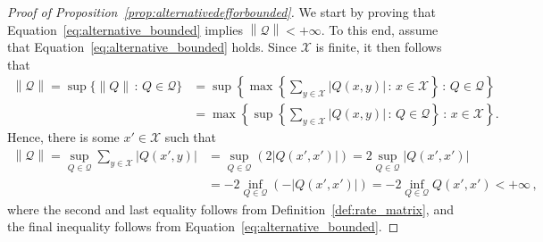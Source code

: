 \documentclass[10pt,a4paper]{paper}
\theoremstyle{definition}
\newcommand{\states}{\mathcal{X}}
\newcommand{\rateset}{\mathcal{Q}}
\newcommand{\norm}[1]{\left\lVert #1 \right\rVert}
\newcommand{\abs}[1]{\left\vert #1 \right\vert}
\newcommand{\coloneqq}{:\!=}
\begin{document}
\begin{proof}[Proof of Proposition~\ref{prop:alternativedefforbounded}]
We start by proving that Equation~\eqref{eq:alternative_bounded} implies $\norm{\rateset}<+\infty$. %
 To this end, assume that Equation~\eqref{eq:alternative_bounded} holds. Since $\states$ is finite, it then follows that
\begin{align*}
\norm{\rateset} = \sup\{\norm{Q}\,:\,Q\in\rateset\}
 &= \sup\left\{\max\left\{\sum_{y\in\states}\abs{Q(x,y)}\,:\,x\in\states\right\}\,:\,Q\in\rateset\right\} \\
 &= \max\left\{\sup\left\{\sum_{y\in\states}\abs{Q(x,y)}\,:\,Q\in\rateset\right\} \,:\,x\in\states\right\}.
\end{align*}Hence, there is some $x'\in\states$ such that
\begin{align*}
\norm{\rateset} = \sup_{Q\in\rateset}\sum_{y\in\states}\abs{Q(x',y)}
&=\sup_{Q\in\rateset}\left(2\abs{Q(x',x')}\right)
 = 2\sup_{Q\in\rateset}\abs{Q(x',x')}\\
 &= -2\inf_{Q\in\rateset}\left(-\abs{Q(x',x')}\right)
 = -2\inf_{Q\in\rateset}Q(x',x')< +\infty\,,
\end{align*}
where the second and last equality follows from Definition~\ref{def:rate_matrix}, and the final inequality follows from Equation~\eqref{eq:alternative_bounded}.


\end{proof}
\end{document}

